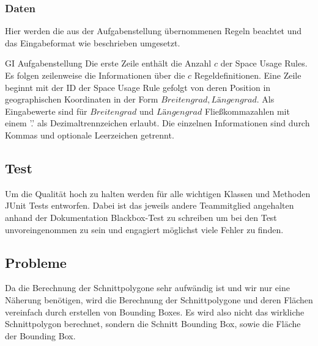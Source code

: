 \subsubsection{Daten}
\label{sec:Eingabedaten_GI}
Hier werden die aus der Aufgabenstellung übernommenen Regeln beachtet und das Eingabeformat wie beschrieben umgesetzt.
\begin{aquote}{GI Aufgabenstellung}
Die erste Zeile enthält die Anzahl $c$ der Space Usage Rules. Es folgen zeilenweise die Informationen
über die $c$ Regeldefinitionen.
Eine Zeile beginnt mit der ID der Space Usage Rule gefolgt von deren Position in geographischen
Koordinaten in der Form $Breitengrad, Längengrad$. Als Eingabewerte sind für $Breitengrad$ und
$Längengrad$ Fließkommazahlen mit einem ’.’ als Dezimaltrennzeichen erlaubt. Die einzelnen Informationen
sind durch Kommas und optionale Leerzeichen getrennt.
\end{aquote}

\subsection{Test}
Um die Qualität hoch zu halten werden für alle wichtigen Klassen und Methoden JUnit Tests
entworfen. Dabei ist das jeweils andere Teammitglied angehalten anhand der Dokumentation Blackbox-Test zu 
schreiben um bei den Test unvoreingenommen zu sein und engagiert möglichst viele Fehler zu finden.



\subsection{Probleme}
Da die Berechnung der Schnittpolygone sehr aufwändig ist und wir nur eine Näherung benötigen,
wird die Berechnung der Schnittpolygone und deren Flächen vereinfach durch erstellen von Bounding Boxes.
Es wird also nicht das wirkliche Schnittpolygon berechnet, sondern die Schnitt Bounding Box, sowie die Fläche der Bounding Box.
